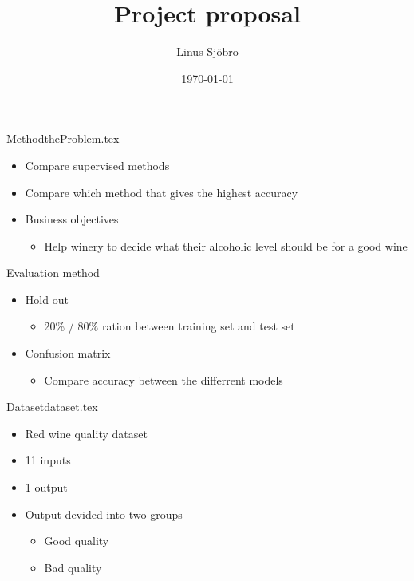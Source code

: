 \documentclass{beamer}
\title{Project proposal}
\date{\today}
\author{Linus Sjöbro}
\institute{Mid Sweden University}
\begin{document}
  \maketitle

  \begin{notedFrame}{Method}{theProblem.tex}
    \begin{itemize}
      \item Compare supervised methods
      \item Compare which method that gives the highest accuracy
      \item Business objectives
      \begin{itemize}
        \item Help winery to decide what their alcoholic level should be for a good wine
      \end{itemize}
    \end{itemize}
  \end{notedFrame}

  \begin{frame}{Evaluation method}
    \begin{itemize}
      \item Hold out
      \begin{itemize}
        \item 20\% / 80\% ration between training set and test set
      \end{itemize}
      \item Confusion matrix
      \begin{itemize}
        \item Compare accuracy between the differrent models
      \end{itemize}
    \end{itemize}
  \end{frame}

  \begin{notedFrame}{Dataset}{dataset.tex}
    \begin{itemize}
      \item Red wine quality dataset
      \item 11 inputs
      \item 1 output
      \item Output devided into two groups
      \begin{itemize}
        \item Good quality
        \item Bad quality
      \end{itemize}
    \end{itemize}
  \end{notedFrame}
\end{document}
